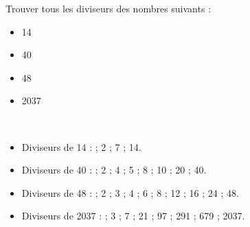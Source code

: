\begin{exercice*}
    Trouver tous les diviseurs des nombres suivants :
    \begin{multicols}{2}
        \begin{itemize}
           \item 14
           \item 40
           \item 48
           \item \num{2 037}
        \end{itemize}
    \end{multicols}
 \end{exercice*} 
 \begin{corrige}
    \phantom{rrr}\\
    \begin{changemargin}{-5mm}{-5mm}        
        \begin{itemize}
           \item Diviseurs de 14 : { ; 2 ; 7 ; 14}.
           \item Diviseurs de 40 : { ; 2 ; 4 ; 5 ; 8 ; 10 ; 20 ; 40}.
           \item Diviseurs de 48 : { ; 2 ; 3 ; 4 ; 6 ; 8 ; 12 ; 16 ; 24 ; 48}.
           \item Diviseurs de \num{2 037} : { ; 3 ; 7 ; 21 ; 97 ; 291 ; 679 ; \num{2 037}}.
        \end{itemize}
    \end{changemargin}
 \end{corrige}
